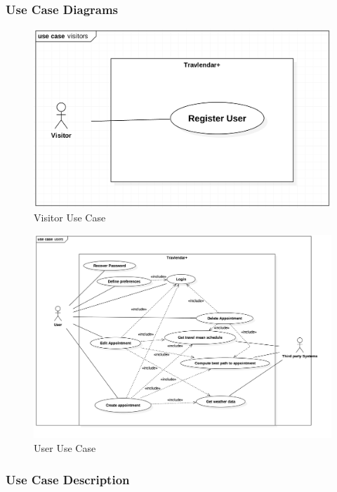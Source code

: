 \documentclass[12pt]{article}
\begin{document}
\subsubsection{Use Case Diagrams}
\begin{figure}[H]
        \includegraphics[scale=0.4]{visitorUseCase.png}
        \centering
        \caption{Visitor Use Case}
    \label{fig:domainModel}
\end{figure}

\begin{figure}[H]
        \includegraphics[scale=0.5]{userUseCase.png}
        \centering
        \caption{User Use Case}
    \label{fig:domainModel}
    \end{figure}
    
\newpage

\subsubsection{Use Case Description}
\end{document}
